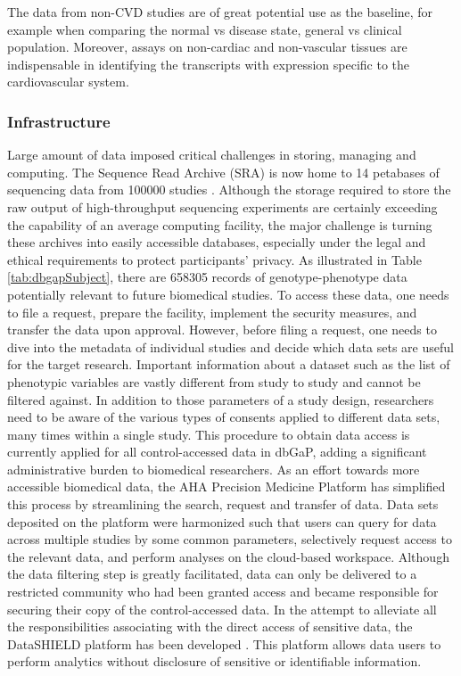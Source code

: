\documentclass[letter]{bioinfo}
\begin{document}
The data from non-CVD studies are of great potential use as the baseline, for example when comparing the normal vs disease state, general vs clinical population. Moreover, assays on non-cardiac and non-vascular tissues are indispensable in identifying the transcripts with expression specific to the cardiovascular system.

\subsubsection{Infrastructure}

Large amount of data imposed critical challenges in storing, managing and computing. The Sequence Read Archive (SRA) is now home to 14 petabases of sequencing data from 100000 studies \citep{Langmead:2018:Cloud}.
Although the storage required to store the raw output of high-throughput sequencing experiments are certainly exceeding the capability of an average computing facility, the major challenge is turning these archives into easily accessible databases, especially under the legal and ethical requirements to protect participants' privacy.
As illustrated in Table \ref{tab:dbgapSubject}, there are 658305 records of genotype-phenotype data potentially relevant to future biomedical studies. To access these data, one needs to file a request, prepare the facility, implement the security measures, and transfer the data upon approval. However, before filing a request, one needs to dive into the metadata of individual studies and decide which data sets are useful for the target research. Important information about a dataset such as the list of phenotypic variables are vastly different from study to study and cannot be filtered against. In addition to those parameters of a study design, researchers need to be aware of the various types of consents applied to different data sets, many times within a single study. This procedure to obtain data access is currently applied for all control-accessed data in dbGaP, adding a significant administrative burden to biomedical researchers.
As an effort towards more accessible biomedical data, the AHA Precision Medicine Platform \citep{Kass-Hout:2018:American} has simplified this process by streamlining the search, request and transfer of data. Data sets deposited on the platform were harmonized such that users can query for data across multiple studies by some common parameters, selectively request access to the relevant data, and perform analyses on the cloud-based workspace.
Although the data filtering step is greatly facilitated, data can only be delivered to a restricted community who had been granted access and became responsible for securing their copy of the control-accessed data. In the attempt to alleviate all the responsibilities associating with the direct access of sensitive data, the DataSHIELD platform has been developed \citep{Gaye:2014:DataSHIELD, Wilson:2017:DataSHIELD}. This platform allows data users to perform analytics without disclosure of sensitive or identifiable information.
\end{document}
